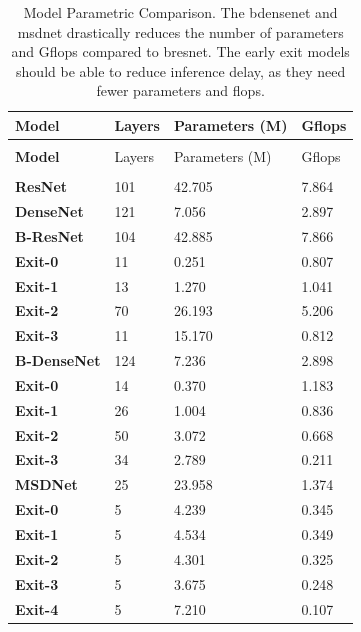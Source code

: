 \begin{minipage}[t]{\linewidth}

\begin{small}
	
	\begin{longtabu}{>{\bfseries}X|X[r]|X[r]|X[r]}
		\caption[Model comparison]{ Model Parametric Comparison. The \gls{bdensenet} and \gls{msdnet} drastically reduces the number of parameters and G\gls{flop}s compared to \gls{bresnet}. The early exit models should be able to reduce inference delay, as they need fewer parameters and \gls{flop}s.}\label{tbl:models} \\
		\toprule
		\rowfont{\bfseries}
		Model  & Layers & Parameters (M) & G\gls{flop}s \tabularnewline
		\hline
		\endfirsthead
		\\
		\toprule
		\rowfont{\bfseries}
		Model & Layers & Parameters (M) & G\gls{flop}s \tabularnewline
		\hline
		\endhead %
		\hline
		\\
		\endfoot
		\hline
		\endlastfoot
		ResNet & 101 & 42.705 & 7.864 \tabularnewline
		\hline
		DenseNet & 121 & 7.056 & 2.897 \tabularnewline
		\hline
		B-ResNet & 104 & 42.885 &  7.866 \tabularnewline 
		\hspace{3mm} Exit-0  & 11 &   0.251 & 0.807 \tabularnewline
		\hspace{3mm} Exit-1  & 13 &   1.270 & 1.041 \tabularnewline
		\hspace{3mm} Exit-2  & 70 &  26.193 & 5.206 \tabularnewline
		\hspace{3mm} Exit-3  & 11 &  15.170 & 0.812 \tabularnewline
		\hline
		B-DenseNet 			 & 124 & 7.236 & 2.898\tabularnewline
		\hspace{3mm} Exit-0  & 14 & 0.370 & 1.183  \tabularnewline
		\hspace{3mm} Exit-1  & 26 & 1.004 & 0.836  \tabularnewline
		\hspace{3mm} Exit-2  & 50 & 3.072 & 0.668  \tabularnewline
		\hspace{3mm} Exit-3  & 34 & 2.789 & 0.211  \tabularnewline
		\hline
		MSDNet 				 & 25 & 23.958 & 1.374 \tabularnewline
		\hspace{3mm} Exit-0  & 5  & 4.239  & 0.345 \tabularnewline
		\hspace{3mm} Exit-1  & 5  & 4.534  & 0.349 \tabularnewline
		\hspace{3mm} Exit-2  & 5  & 4.301  & 0.325 \tabularnewline
		\hspace{3mm} Exit-3  & 5  & 3.675  & 0.248 \tabularnewline
		\hspace{3mm} Exit-4  & 5  & 7.210  & 0.107 \tabularnewline
		\bottomrule
	\end{longtabu}
\end{small}
\end{minipage}


